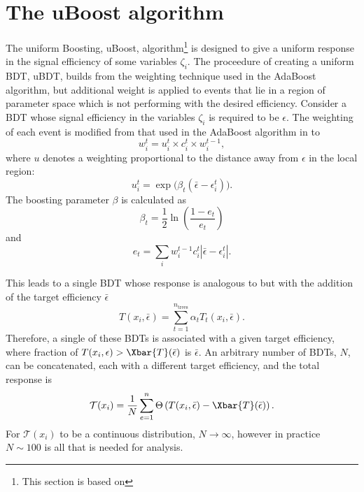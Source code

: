 \section{The uBoost algorithm}
\label{sec:bdt:uboost}
The uniform Boosting, uBoost, algorithm\footnote{
  This section is based on } is designed to give a uniform
response in the signal efficiency of some variables $\zeta_i$.
The proceedure of creating a uniform BDT, uBDT, builds from the weighting technique used in the
AdaBoost algorithm, but additional weight is applied to events that lie in a region of parameter
space which is not performing with the desired efficiency.
Consider a BDT whose signal efficiency in the variables $\zeta_i$ is required to be $\epsilon$.
The weighting of each event is modified from that used in the AdaBoost algorithm in 
to
\begin{equation}
  w_i^t = u_i^t\times c_i^t \times w_i^{t-1},
\end{equation}
where $u$ denotes a weighting proportional to the distance away from $\epsilon$ in the local
region:
\begin{equation}
  u_i^t = \exp\big(\beta_t(\bar\epsilon-\epsilon_i^t)\big).
\end{equation}
The boosting parameter $\beta$ is calculated as
\begin{equation}
  \beta_t = \frac12\ln\left(\frac{1-e_t}{e_t}\right)
\end{equation}
and
\begin{equation}
  e_t = \sum_i w_i^{t-1}c_i^t\left|\bar\epsilon-\epsilon_i^t\right|.
\end{equation}

This leads to a single BDT whose response is analogous to  but with the addition
of the target efficiency $\bar\epsilon$
\begin{equation}
  T(x_i,\bar\epsilon) = \sum_{t=1}^{n_\mathrm{trees}} \alpha_tT_t(x_i,\bar\epsilon).
  \label{eq:ada:fullbdt}
\end{equation}
Therefore, a single of these BDTs is associated with a given target efficiency, where
fraction of $T(x_i,\epsilon)>\Xbar{T}(\bar\epsilon)$ is $\bar\epsilon$.
An arbitrary number of BDTs, $N$, can be concatenated, each with a different target efficiency, and
the total response is
\begin{equation}
  \mathcal{T}(x_i) =
  \frac1N\sum_{e=1}^{n}\Theta\left(T(x_i, \bar\epsilon) - \Xbar{T}(\bar\epsilon)\right).
\end{equation}
For $\mathcal{T}(x_i)$ to be a continuous distribution, $N\!\to\infty$, however in practice
$N\sim100$ is all that is needed for analysis.






